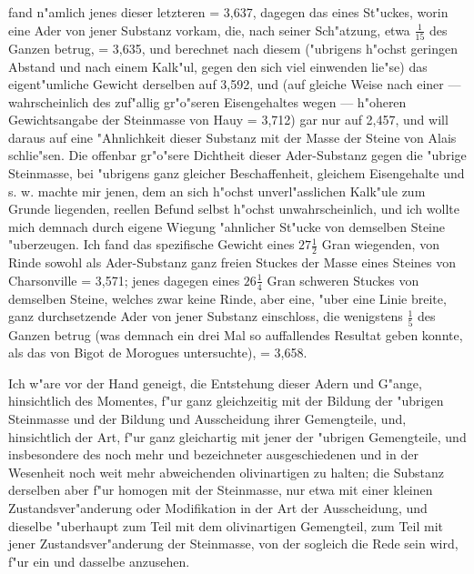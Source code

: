 \documentclass[a4paper, 11pt, oneside, german]{article}
\begin{document}
{fand n"amlich jenes dieser letzteren = 3,637, dagegen das eines St"uckes, worin eine Ader von jener Substanz vorkam, die, nach seiner Sch"atzung, etwa $\frac{1}{15}$ des Ganzen betrug, = 3,635, und berechnet nach diesem ("ubrigens h"ochst geringen Abstand und nach einem Kalk"ul, gegen den sich viel einwenden lie"se) das eigent"umliche Gewicht derselben auf 3,592, und (auf gleiche Weise nach einer --- wahrscheinlich des zuf"allig gr"o"seren Eisengehaltes wegen --- h"oheren Gewichtsangabe der Steinmasse von Hauy = 3,712) gar nur auf 2,457, und will daraus auf eine "Ahnlichkeit dieser Substanz mit der Masse der Steine von Alais schlie"sen. Die offenbar gr"o"sere Dichtheit dieser Ader-Substanz gegen die "ubrige Steinmasse, bei "ubrigens ganz gleicher Beschaffenheit, gleichem Eisengehalte und s. w. machte mir jenen, dem an sich h"ochst unverl"asslichen Kalk"ule zum Grunde liegenden, reellen Befund selbst h"ochst unwahrscheinlich, und ich wollte mich demnach durch eigene Wiegung "ahnlicher St"ucke von demselben Steine "uberzeugen. Ich fand das spezifische Gewicht eines $27\frac{1}{2}$ Gran wiegenden, von Rinde sowohl als Ader-Substanz ganz freien Stuckes der Masse eines Steines von Charsonville = 3,571; jenes dagegen eines $26\frac{1}{4}$ Gran schweren Stuckes von demselben Steine, welches zwar keine Rinde, aber eine, "uber eine Linie breite, ganz durchsetzende Ader von jener Substanz einschloss, die wenigstens $\frac{1}{5}$ des Ganzen betrug (was demnach ein drei Mal so auffallendes Resultat geben konnte, als das von Bigot de Morogues untersuchte), = 3,658.}

Ich w"are vor der Hand geneigt, die Entstehung dieser Adern und G"ange, hinsichtlich des Momentes, f"ur ganz gleichzeitig mit der Bildung der "ubrigen Steinmasse und der Bildung und Ausscheidung ihrer Gemengteile, und, hinsichtlich der Art, f"ur ganz gleichartig mit jener der "ubrigen Gemengteile, und insbesondere des noch mehr und bezeichneter ausgeschiedenen und in der Wesenheit noch weit mehr abweichenden olivinartigen zu halten; die Substanz derselben aber f"ur homogen mit der Steinmasse, nur etwa mit einer kleinen Zustandsver"anderung oder Modifikation in der Art der Ausscheidung, und dieselbe "uberhaupt zum Teil mit dem olivinartigen Gemengteil, zum Teil mit jener Zustandsver"anderung der Steinmasse, von der sogleich die Rede sein wird, f"ur ein und dasselbe anzusehen.
\end{document}
